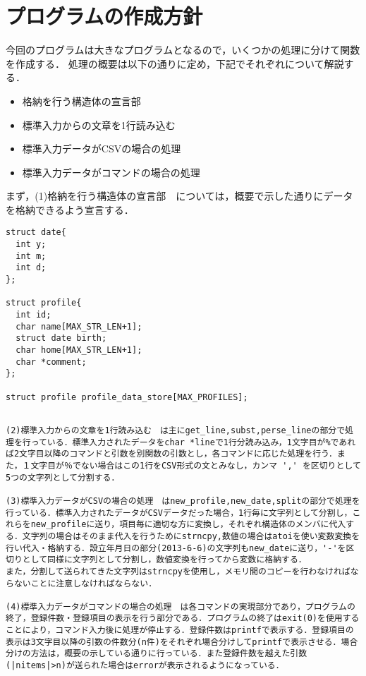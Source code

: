 \documentclass[a4j]{jarticle}
\begin{document}
%
%

\section{プログラムの作成方針}

今回のプログラムは大きなプログラムとなるので，いくつかの処理に分けて関数を作成する．
処理の概要は以下の通りに定め，下記でそれぞれについて解説する．
\begin{itemize}
\item[(1)]格納を行う構造体の宣言部
\item[(2)]標準入力からの文章を1行読み込む
\item[(3)]標準入力データがCSVの場合の処理
\item[(4)]標準入力データがコマンドの場合の処理
\end{itemize}

まず，(1)格納を行う構造体の宣言部　については，概要で示した通りにデータを格納できるよう宣言する．

{\baselineskip 3mm
\begin{verbatim}
struct date{
  int y;
  int m;
  int d;
};

struct profile{
  int id;
  char name[MAX_STR_LEN+1];
  struct date birth;
  char home[MAX_STR_LEN+1];
  char *comment;
};

struct profile profile_data_store[MAX_PROFILES];
\end{verbatim}
}


{\baselineskip 3mm
\begin{verbatim}

(2)標準入力からの文章を1行読み込む　は主にget_line,subst,perse_lineの部分で処理を行っている．標準入力されたデータをchar *lineで1行分読み込み，1文字目が%であれば2文字目以降のコマンドと引数を別関数の引数とし，各コマンドに応じた処理を行う．また，１文字目が％でない場合はこの1行をCSV形式の文とみなし，カンマ ',' を区切りとして5つの文字列として分割する．

(3)標準入力データがCSVの場合の処理　はnew_profile,new_date,splitの部分で処理を行っている．標準入力されたデータがCSVデータだった場合，1行毎に文字列として分割し，これらをnew_profileに送り，項目毎に適切な方に変換し，それぞれ構造体のメンバに代入する．文字列の場合はそのまま代入を行うためにstrncpy,数値の場合はatoiを使い変数変換を行い代入・格納する．設立年月日の部分(2013-6-6)の文字列もnew_dateに送り，'-'を区切りとして同様に文字列として分割し，数値変換を行ってから変数に格納する．
また，分割して送られてきた文字列はstrncpyを使用し，メモリ間のコピーを行わなければならないことに注意しなければならない．

(4)標準入力データがコマンドの場合の処理　は各コマンドの実現部分であり，プログラムの終了，登録件数・登録項目の表示を行う部分である．プログラムの終了はexit(0)を使用することにより，コマンド入力後に処理が停止する．登録件数はprintfで表示する．登録項目の表示は3文字目以降の引数の件数分(n件)をそれぞれ場合分けしてprintfで表示させる．場合分けの方法は，概要の示している通りに行っている．また登録件数を越えた引数(|nitems|>n)が送られた場合はerrorが表示されるようになっている．

\end{verbatim}
}
\end{document}
